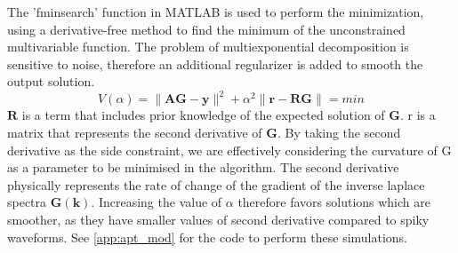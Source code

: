 The 'fminsearch' function in MATLAB is used to perform the minimization, using a derivative-free method to find the minimum of the unconstrained multivariable function.
The problem of multiexponential decomposition is sensitive to noise, therefore an additional regularizer is added to smooth the output solution.
\begin{equation}
    V(\alpha) = \lVert \mathbf{AG} - \mathbf{y}\lVert^{2}+\alpha^{2}\lVert \mathbf{r} - \mathbf{RG}\lVert  = min
\end{equation}
$\mathbf{R}$ is a term that includes prior knowledge of the expected solution of $\mathbf{G}$. r is a matrix that represents the second derivative of $\mathbf{G}$. By taking the second derivative as the side constraint, we are effectively considering the curvature of G as a parameter to be minimised in the algorithm. The second derivative physically represents the rate of change of the gradient of the inverse laplace spectra $\mathbf{G(k)}$. Increasing the value of $\alpha$ therefore favors solutions which are smoother, as they have smaller values of second derivative compared to spiky waveforms. See \autoref{app:apt_mod} for the code to perform these simulations.\\\\
